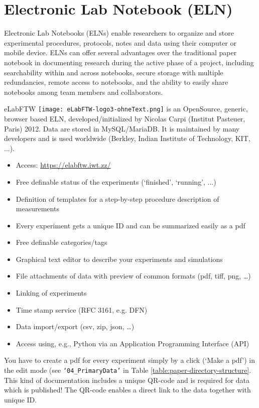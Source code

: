 \section[Electronic Lab Notebook]{Electronic Lab Notebook (ELN)}\label{ssc:ELN}

Electronic Lab Notebooks (ELNs) enable researchers to organize and store
experimental procedures, protocols, notes and data using their computer or
mobile device. ELNs can offer several advantages over the traditional paper
notebook in documenting research during the active phase of a project, including
searchability within and across notebooks, secure storage with multiple
redundancies, remote access to notebooks, and the ability to easily share
notebooks among team members and collaborators.

eLabFTW \texttt{[image: eLabFTW-logo3-ohneText.png]} is an OpenSource, generic, browser based ELN, developed/initialized by
Nicolas Carpi (Institut Pasteuer, Paris) 2012. Data are stored in MySQL/MariaDB.
It is maintained by many developers and is used worldwide (Berkley, Indian
Institute of Technology, KIT, ...).
\begin{itemize}
  \item Access: \url{https://elabftw.iwt.zz/}
  \item Free definable status of the experiments (`finished', `running', ...)
  \item Definition of templates for a step-by-step procedure description of
        measurements
  \item Every experiment gets a unique ID and can be summarized easily as a pdf
  \item Free definable categories/tags
  \item Graphical text editor to describe your experiments and simulations
  \item File attachments of data with preview of common formats (pdf, tiff, png, …)
  \item Linking of experiments
  \item Time stamp service (RFC 3161, e.g. DFN)
  \item Data import/export (csv, zip, json, …)
  \item Access using, e.g., Python via an Application Programming Interface (API)
\end{itemize}

You have to create a pdf for every experiment simply by a click (‘Make a pdf’)
in the edit mode (see \texttt{‘04\_PrimaryData’} in Table
\ref{table:paper-directory-structure}. This kind of documentation includes a
unique QR-code and is required for data which is published! The QR-code enables
a direct link to the data together with unique ID.

